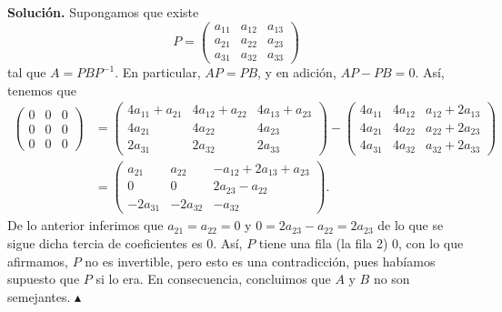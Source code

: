 \documentclass[11pt]{scrartcl}
\begin{document}
\textbf{Solución.} Supongamos que existe
\begin{equation}
    P=
    \begin{pmatrix}
        a_{11} & a_{12} & a_{13} \\
        a_{21} & a_{22} & a_{23} \\
        a_{31} & a_{32} & a_{33}
    \end{pmatrix}
\end{equation}
tal que $A=PBP^{-1}$. En particular, $AP=PB$, y en adición, $AP-PB=0$. Así, tenemos que
\begin{align*}
    \begin{pmatrix}
        0 & 0 & 0 \\
        0 & 0 & 0 \\
        0 & 0 & 0
    \end{pmatrix} &=
    \begin{pmatrix}
        4a_{11}+a_{21} & 4a_{12}+a_{22} & 4a_{13}+a_{23} \\
        4a_{21} & 4a_{22} & 4a_{23} \\
        2a_{31} & 2a_{32} & 2a_{33}
    \end{pmatrix} -
    \begin{pmatrix}
        4a_{11} & 4a_{12} & a_{12}+2a_{13} \\
        4a_{21} & 4a_{22} & a_{22}+2a_{23} \\
        4a_{31} & 4a_{32} & a_{32}+2a_{33}
    \end{pmatrix} \\
    &=
    \begin{pmatrix}
    a_{21} & a_{22} & -a_{12} + 2a_{13} + a_{23} \\
    0 & 0 & 2a_{23} - a_{22} \\
    -2a_{31} & -2a_{32} & -a_{32}
\end{pmatrix}.
\end{align*}
De lo anterior inferimos que $a_{21}=a_{22}=0$  y $0=2a_{23}-a_{22}=2a_{23}$ de lo que se sigue
dicha tercia de coeficientes es 0. Así, $P$ tiene una fila (la fila 2) 0, con lo que afirmamos, $P$ no
es invertible, pero esto es una contradicción, pues habíamos supuesto que $P$ si lo era. En consecuencia,
concluimos que $A$ y $B$ no son semejantes. $\blacktriangle$
\end{document}
